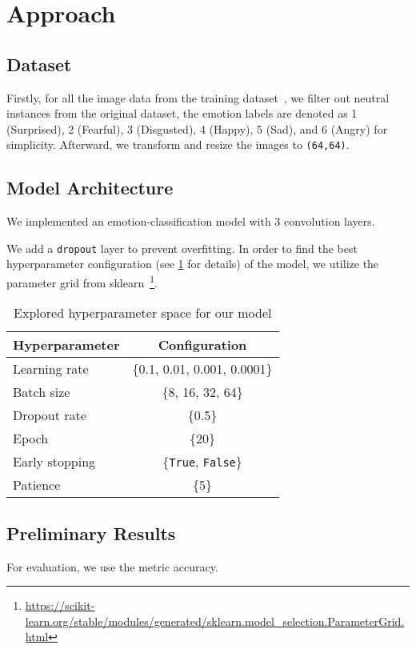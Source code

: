 \section{Approach}
\label{sec:approach}

\subsection{Dataset}
Firstly, 
for all the image data from the training dataset~\cite{li2017reliable,li2019reliable}, 
we filter out neutral instances from the original dataset, 
the emotion labels are denoted as 1 (Surprised), 2 (Fearful), 3 (Disgusted), 4 (Happy), 5 (Sad), and 6 (Angry) for simplicity. 
Afterward, 
we transform and resize the images to \texttt{(64,64)}. 

\subsection{Model Architecture}
We implemented an emotion-classification model with 3 convolution layers.

We add a \texttt{dropout} layer to prevent overfitting. 
In order to find the best hyperparameter configuration (see \cref{tab:hyper} for details) of the model, 
we utilize the parameter grid from sklearn~\footnote{\url{https://scikit-learn.org/stable/modules/generated/sklearn.model_selection.ParameterGrid.html}}. 


\begin{table}
    \centering
    \begin{tabular}{@{}lc@{}}
      \toprule
      Hyperparameter & Configuration \\
      \midrule
      Learning rate & \{0.1, 0.01, 0.001, 0.0001\}  \\
      Batch size & \{8, 16, 32, 64\} \\
      Dropout rate & \{0.5\} \\
      Epoch & \{20\} \\
      Early stopping & \{\texttt{True}, \texttt{False}\} \\
      Patience & \{5\} \\
      \bottomrule
    \end{tabular}
    \caption{Explored hyperparameter space for our model}
    \label{tab:hyper}
  \end{table}

\subsection{Preliminary Results}

For evaluation, we use the metric accuracy.